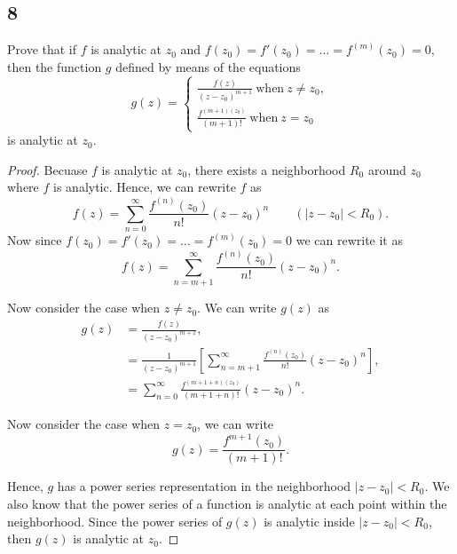 \documentclass{article}
\begin{document}
\subsection*{8}
Prove that if $f$ is analytic at $z_0$ and $f(z_0) = f'(z_0) = \dots = f^{(m)}(z_0)=0$,
then the function $g$ defined by means of the equations
\begin{equation*}
    g(z) = \begin{cases}
        \frac{f(z)}{(z-z_0)^{m+1}} \ \text{when} \ z \neq z_0, \\
        \frac{f^{(m+1)(z_0)}}{(m+1)!} \ \text{when} \ z = z_0
    \end{cases}
\end{equation*}
is analytic at $z_0$.

\begin{proof}
    Becuase $f$ is analytic at $z_0$, there exists a neighborhood $R_0$ around $z_0$ where
    $f$ is analytic. Hence, we can rewrite $f$ as
    \begin{equation*}
        f(z) = \sum_{n=0}^\infty \frac{f^{(n)}(z_0)}{n!}(z-z_0)^n \qquad (|z-z_0|<R_0).
    \end{equation*}
    Now since $f(z_0) = f'(z_0) = \dots = f^{(m)}(z_0)=0$ we can rewrite it as
    \begin{equation*}
        f(z) = \sum_{n=m+1}^\infty \frac{f^{(n)}(z_0)}{n!}(z-z_0)^n.
    \end{equation*}

    Now consider the case when $z \neq z_0$. We can write $g(z)$ as
    \begin{align*}
        g(z) & = \frac{f(z)}{(z-z_0)^{m+1}},                                                               \\
             & = \frac{1}{(z-z_0)^{m+1}}\left[\sum_{n=m+1}^\infty \frac{f^{(n)}(z_0)}{n!}(z-z_0)^n\right], \\
             & = \sum_{n=0}^\infty \frac{f^{(m+1+n)(z_0)}}{(m+1+n)!}(z-z_0)^n.
    \end{align*}

    Now consider the case when $z = z_0$, we can write
    \begin{equation*}
        g(z) = \frac{f^{m+1}(z_0)}{(m+1)!}.
    \end{equation*}

    Hence, $g$ has a power series representation in the neighborhood $|z-z_0|<R_0$.
    We also know that the power series of a function is analytic at each point within
    the neighborhood. Since the power series of $g(z)$ is analytic inside $|z-z_0|<R_0$,
    then $g(z)$ is analytic at $z_0$.
\end{proof}
\end{document}
